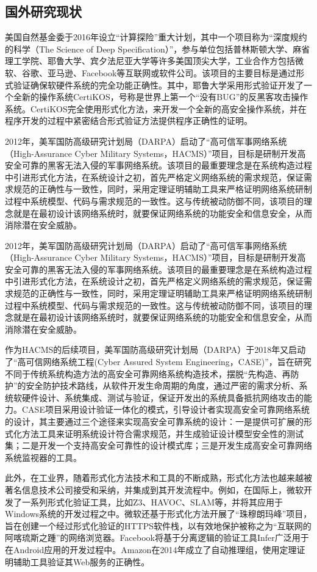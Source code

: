 \subsection{国外研究现状}
\par
美国自然基金委于2016年设立“计算探险”重大计划，其中一个项目称为“深度规约的科学（The Science of Deep Specification）”，参与单位包括普林斯顿大学、麻省理工学院、耶鲁大学、宾夕法尼亚大学等许多美国顶尖大学，工业合作方包括微软、谷歌、亚马逊、Facebook等互联网或软件公司。该项目的主要目标是通过形式验证确保软硬件系统的完全功能正确性。其中，耶鲁大学采用形式验证开发了一个全新的操作系统CertiKOS，号称是世界上第一个“没有BUG”的反黑客攻击操作系统。CertiKOS完全使用形式化方法，来开发一个全新的高安全操作系统，并在程序开发的过程中紧密结合形式验证方法提供程序正确性的证明。
\par
2012年，美军国防高级研究计划局（DARPA）启动了“高可信军事网络系统（High-Assurance Cyber Military Systems，HACMS）”项目，目标是研制开发高安全可靠的黑客无法入侵的军事网络系统。该项目的最重要理念是在系统构造过程中引进形式化方法，在系统设计之初，首先严格定义网络系统的需求规范，保证需求规范的正确性与一致性，同时，采用定理证明辅助工具来严格证明网络系统研制过程中系统模型、代码与需求规范的一致性。这与传统被动防御不同，该项目的理念就是在最初设计该网络系统时，就要保证网络系统的功能安全和信息安全，从而消除潜在安全威胁。
\par
2012年，美军国防高级研究计划局（DARPA）启动了“高可信军事网络系统（High-Assurance Cyber Military Systems，HACMS）”项目，目标是研制开发高安全可靠的黑客无法入侵的军事网络系统。该项目的最重要理念是在系统构造过程中引进形式化方法，在系统设计之初，首先严格定义网络系统的需求规范，保证需求规范的正确性与一致性，同时，采用定理证明辅助工具来严格证明网络系统研制过程中系统模型、代码与需求规范的一致性。这与传统被动防御不同，该项目的理念就是在最初设计该网络系统时，就要保证网络系统的功能安全和信息安全，从而消除潜在安全威胁。
\par
作为HACMS的后续项目，美军国防高级研究计划局（DARPA）于2018年又启动了“高可信网络系统工程(Cyber Assured System Engineering，CASE)”，旨在研究不同于传统系统构造方法的高安全可靠网络系统构造技术，摆脱“先构造、再防护”的安全防护技术路线，从软件开发生命周期的角度，通过严密的需求分析、系统软硬件设计、系统集成、测试与验证，保证开发出的系统具备抵抗网络攻击的能力。CASE项目采用设计验证一体化的模式，引导设计者实现高安全可靠网络系统的设计，其主要通过三个途径来实现高安全可靠系统的设计：一是提供可扩展的形式化方法工具来证明系统设计符合需求规范，并生成验证设计模型安全性的测试集；二是开发一个支持高安全可靠性的设计模式库；三是开发生成高安全可靠网络系统监视器的工具。
\par
此外，在工业界，随着形式化方法技术和工具的不断成熟，形式化方法也越来越被著名信息技术公司接受和采纳，并集成到其开发流程中。例如，在国际上，微软开发了一系列形式化验证工具，比如Z3、HAVOC、SLAM等，并将其应用于Windows系统的开发过程之中。微软还基于形式化方法开展了“珠穆朗玛峰”项目，旨在创建一个经过形式化验证的HTTPS软件栈，以有效地保护被称之为“互联网的阿喀琉斯之踵”的网络浏览器。Facebook将基于分离逻辑的验证工具Infer广泛用于在Android应用的开发过程中。Amazon在2014年成立了自动推理组，使用定理证明辅助工具验证其Web服务的正确性。
